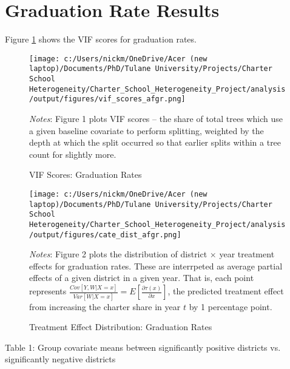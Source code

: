\documentclass{article} %
\begin{document}
	\section{Graduation Rate Results}

	Figure \ref{fig:image1} shows the VIF scores for graduation rates. 

\begin{figure}[H]
\centering
\texttt{[image: c:/Users/nickm/OneDrive/Acer (new laptop)/Documents/PhD/Tulane University/Projects/Charter School Heterogeneity/Charter\_School\_Heterogeneity\_Project/analysis/output/figures/vif\_scores\_afgr.png]}
\caption{VIF Scores: Graduation Rates}
\label{fig:image1}
\begin{minipage}{1\linewidth}
\singlespacing
\footnotesize
\emph{Notes}: Figure 1 plots VIF scores -- the share of total trees which use a given baseline covariate to perform splitting, weighted by the depth at which the split occurred so that earlier splits within a tree count for slightly more.  
\end{minipage}
\end{figure}


\begin{figure}[H]
\centering
\texttt{[image: c:/Users/nickm/OneDrive/Acer (new laptop)/Documents/PhD/Tulane University/Projects/Charter School Heterogeneity/Charter\_School\_Heterogeneity\_Project/analysis/output/figures/cate\_dist\_afgr.png]}
\caption{Treatment Effect Distribution: Graduation Rates}
\label{fig:image2}
\begin{minipage}{1\linewidth}
\singlespacing
\footnotesize
\emph{Notes}: Figure 2 plots the distribution of district $\times$ year treatment effects for graduation rates. These are interrpeted as average partial effects of a given district in a given year. That is, each point represents $\frac{Cov[Y, W | X = x]}{Var[W | X = x]} = E\left[ \frac{\partial \tau(x)}{\partial x} \right]$, the predicted treatment effect from increasing the charter share in year $t$ by 1 percentage point.
\end{minipage}
\end{figure}

	

Table 1: Group covariate means between significantly positive districts vs. significantly negative districts\\
\\
\end{document}
